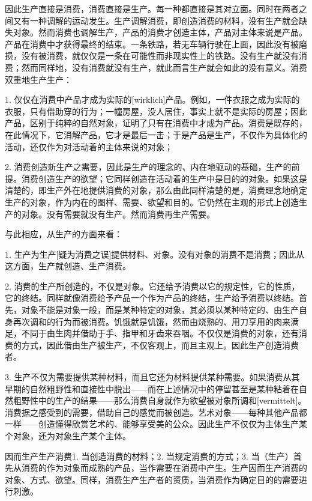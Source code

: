 \documentclass[a5paper,twoside,10.5pt]{ctexart}
\begin{document}
因此生产直接是消费，消费直接是生产。每一种都直接是其对立面。同时在两者之间又有一种调解的运动发生。生产调解消费，即创造消费的材料，没有生产就会缺失对象。然而消费也调解生产，产品的消费才创造主体，产品对主体来说是产品。产品在消费中才获得最终的结束。一条铁路，若无车辆行驶在上面，因此没有被磨损，没有被消费，就仅仅是一条在可能性而非现实性上的铁路。没有生产就没有消费；然而同样地，没有消费就没有生产，就此而言生产就会如此的没有意义。消费双重地生产生产：

1. 仅仅在消费中产品才成为实际的[wirklich]产品。例如，一件衣服之成为实际的衣服，只有借助穿的行为；一幢房屋，没人居住，事实上就不是实际的房屋；因此产品，区别于纯粹的自然对象，证明了只有在消费中才成为产品。消费是既存的，在此情况下，它消解产品，它才是最后一击；于是产品是生产，不仅作为具体化的活动，还仅作为对活动着的主体来说的对象；

2. 消费创造新生产之需要，因此是生产的理念的、内在地驱动的基础，生产的前提。消费创造生产的欲望；它同样创造在活动着的生产中是目的的对象。如果这是清楚的，即生产外在地提供消费的对象，那么由此同样清楚的是，消费理念地确定生产的对象，作为内在的图样、需要、欲望和目的。它仍然在主观的形式上创造生产的对象。没有需要就没有生产。然而消费再生产需要。

与此相应，从生产的方面来看：

1. 生产为生产[疑为消费之误]提供材料、对象。没有对象的消费不是消费；因此从这方面，生产就创造、生产消费。

2. 消费的生产所创造的，不仅是对象。它还给予消费以它的规定性，它的性质，它的终结。同样就像消费给予产品一个作为产品的终结，生产给予消费以终结。首先，对象不能是对象一般，而是某种特定的对象，其必须以某种特定的、由生产自身再次调和的行为而被消费。饥饿就是饥饿，然而由烧熟的、用刀享用的肉来满足，不同于由生肉并借助于手、指甲和牙齿来吞咽。不仅仅是消费的对象，还有消费的方式，因此借由生产被生产，不仅客观上，而且主观上。因此生产创造消费者。

3. 生产不仅为需要提供某种材料，而且它还为材料提供某种需要。如果消费从其早期的自然粗野性和直接性中脱出——而在上述情况中的停留甚至是某种粘着在自然粗野性中的生产的结果——那么消费自身就作为欲望被对象所调和[vermittelt]。消费据之感受到的需要，借助自己的感觉而被创造。艺术对象——每种其他产品都一样——创造懂得欣赏艺术的、能够享受美的公众。因此生产不仅仅为主体生产某个对象，还为对象生产某个主体。

因而生产生产消费1. 当创造消费的材料；2. 当规定消费的方式；3. 当（生产）首先从消费的作为对象而成熟的产品，当作需要在消费中产生。生产因而生产消费的对象、方式、欲望。同样，消费生产生产者的资质，当消费作为确定目的的需要进行刺激。
\end{document}
